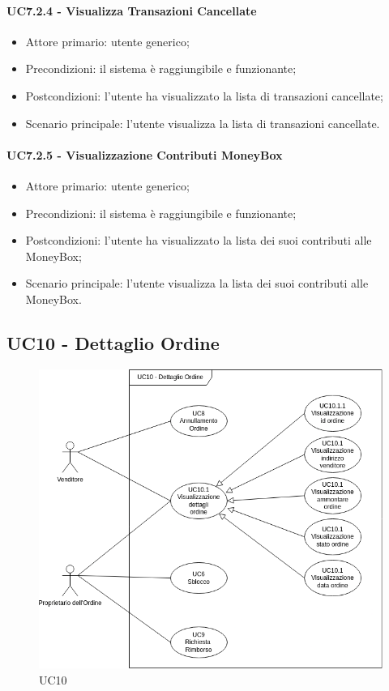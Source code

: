 \paragraph{UC7.2.4 - Visualizza Transazioni Cancellate}

\begin{itemize}
    \item Attore primario: utente generico;
    \item Precondizioni: il sistema è raggiungibile e funzionante;
    \item Postcondizioni: l'utente ha visualizzato la lista di transazioni cancellate;
    \item Scenario principale: l'utente visualizza la lista di transazioni cancellate.
\end{itemize}

\paragraph{UC7.2.5 - Visualizzazione Contributi MoneyBox\glo{}}

\begin{itemize}
    \item Attore primario: utente generico;
    \item Precondizioni: il sistema è raggiungibile e funzionante;
    \item Postcondizioni: l'utente ha visualizzato la lista dei suoi contributi alle MoneyBox\glo{};
    \item Scenario principale: l'utente visualizza la lista dei suoi contributi alle MoneyBox\glo{}.
\end{itemize}

\subsection{UC10 - Dettaglio Ordine}

\begin{figure}[H]
    \centering
    \includegraphics[scale=0.7]{immagini/UC10.png}
    \caption{UC10}
\end{figure}

